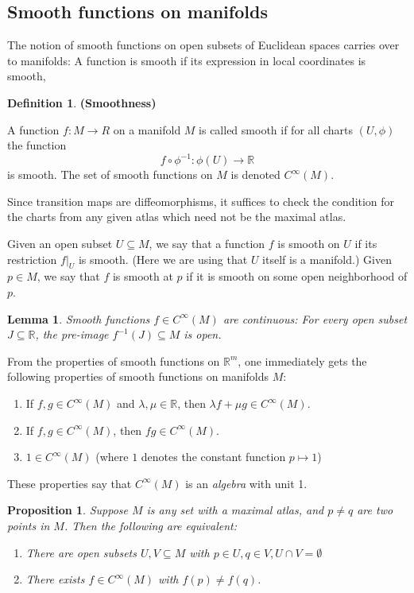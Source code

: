 \documentclass{article}
\newtheorem{proposition}{Proposition}[theorem]
\newtheorem{lemma}[theorem]{Lemma}
\theoremstyle{definition}
\newtheorem{defn}[theorem]{Definition}
\newenvironment{definition}
  {\vspace{8pt}\begin{mdframed}[backgroundcolor=blueish,innertopmargin=4]\begin{defn}}
  {\end{defn}\end{mdframed}\vspace{4pt}}
\begin{document}
\subsection{Smooth functions on manifolds}
The notion of smooth functions on open subsets of Euclidean spaces
carries over to manifolds: A function is smooth if its expression in local coordinates is smooth,

\begin{definition} \textbf{(Smoothness)}

A function $f : M \rightarrow R$ on a manifold $M$ is called smooth if for all charts $(U,\phi)$ the function
\[
    f \circ\phi^{-1}: \phi(U) \rightarrow \mathbb{R}
\]
is smooth. The set of smooth functions on $M$ is denoted $C^{\infty}(M)$.
\end{definition}

Since transition maps are diffeomorphisms, it suffices to check the condition for the charts from any given atlas which need not be the maximal atlas.

Given an open subset $U \subseteq M$, we say that a function $f$ is smooth on $U$ if its restriction $f |_U$ is smooth. (Here we are using that $U$ itself is a manifold.) Given $p \in M$, we say that $f$ is smooth at $p$ if it is smooth on some open neighborhood
of $p$.

\begin{lemma}
Smooth functions $f \in C^{\infty}(M)$ are continuous: For every open subset $J \subseteq \mathbb R$, the pre-image $f^{-1}(J) \subseteq M$ is open.
\end{lemma}


From the properties of smooth functions on $\mathbb R^m$, one immediately gets the following properties of smooth functions on manifolds $M$:
\begin{enumerate}
    \item If $f,g \in C^{\infty}(M)$ and $\lambda, \mu \in \mathbb R$, then $\lambda f + \mu g \in C^\infty(M)$.
    \item If $f,g \in C^\infty(M)$, then $f g \in C^\infty(M)$.
    \item $1 \in C^{\infty}(M)$ (where $1$ denotes the constant function $p \mapsto 1$)
\end{enumerate}

These properties say that $C^{\infty}(M)$ is an \textit{algebra} with unit 1. 

\begin{proposition}
Suppose $M$ is any set with a maximal atlas, and $p \neq q$ are two points in $M$. Then the following are equivalent:
\begin{enumerate}
    \item There are open subsets $U,V \subseteq M$ with $p \in U, q \in V, U \cap V = \emptyset$
    \item There exists $f \in C^\infty(M)$ with $f(p) \neq f(q)$.
\end{enumerate}
\end{proposition}
\end{document}
